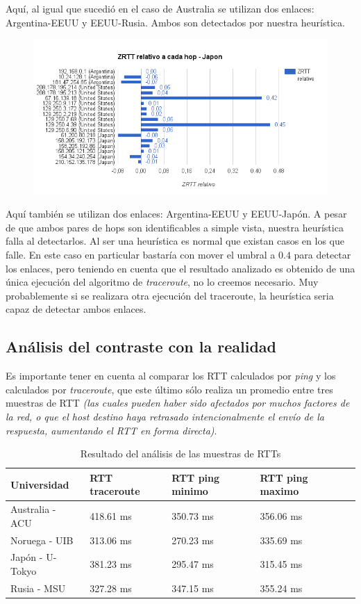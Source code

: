 Aquí, al igual que sucedió en el caso de Australia se utilizan dos enlaces: Argentina-EEUU y EEUU-Rusia. Ambos son detectados por nuestra heurística.

\begin{figure}[H]
  \centering
    \includegraphics[width=1\textwidth]{../Experimentacion/rel-tokyo.png}
\end{figure}

Aquí también se utilizan dos enlaces: Argentina-EEUU y EEUU-Japón. A pesar de que ambos pares de hops son identificables a simple vista, nuestra heurística falla al detectarlos. Al ser una heurística es normal que existan casos en los que falle. En este caso en particular bastaría con mover el umbral a $0.4$ para detectar los enlaces, pero teniendo en cuenta que el resultado analizado es obtenido de una única ejecución del algoritmo de \textit{traceroute}, no lo creemos necesario. Muy probablemente si se realizara otra ejecución del traceroute, la heurística seria capaz de detectar ambos enlaces.

\subsection{Análisis del contraste con la realidad}

Es importante tener en cuenta al comparar los RTT calculados por \textit{ping} y los calculados por \textit{traceroute}, que este último sólo realiza un promedio entre tres muestras de RTT \textit{(las cuales pueden haber sido afectados por muchos factores de la red, o que el host destino haya retrasado intencionalmente el envío de la respuesta, aumentando el RTT en forma directa)}.

\begin{table}[H]
  \centering
    \begin{tabular}{lllll}
    \hline
    Universidad & RTT traceroute & RTT ping minimo & RTT ping maximo \\ \hline
    Australia - ACU &  418.61 ms  &  350.73 ms  &  356.06 ms \\
    Noruega - UIB   &  313.06 ms  &  270.23 ms  &  335.69 ms \\
  Japón - U-Tokyo &  381.23 ms  &  295.47 ms  &  315.45 ms \\
  Rusia - MSU     &  327.28 ms  &  347.15 ms  &  355.24 ms \\ \hline
    \end{tabular}
    \caption{Resultado del análisis de las muestras de RTTs}
  \label{fig:tabla-comp-rtt}
\end{table}


